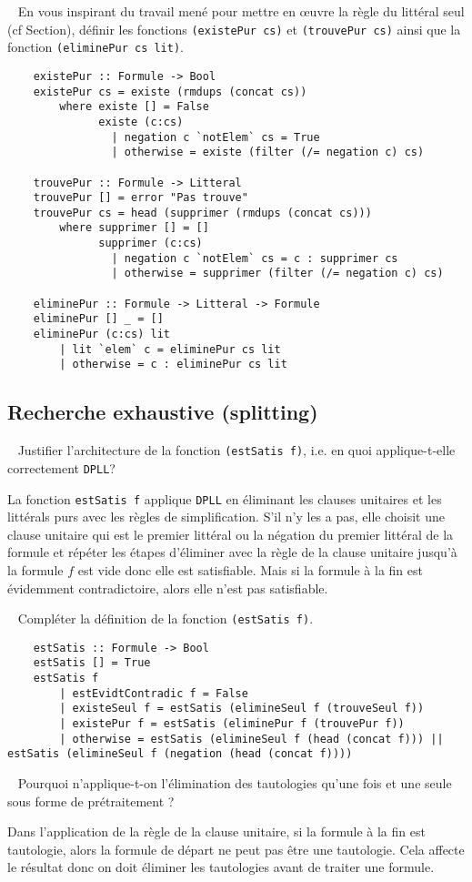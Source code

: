 \documentclass[12pt, pdflatex]{article}
\newcommand{\q}[1]{ \par\smallbreak{\noindent \bf Question #1.}\ }
\begin{document}
    \q{2} En vous inspirant du travail mené pour mettre en œuvre la règle du littéral seul (cf Section), définir les fonctions \texttt{(existePur cs)} et \texttt{(trouvePur cs)} ainsi que la fonction \texttt{(eliminePur cs lit)}.
    \begin{lstlisting}
    existePur :: Formule -> Bool 
    existePur cs = existe (rmdups (concat cs))
        where existe [] = False
              existe (c:cs) 
                | negation c `notElem` cs = True 
                | otherwise = existe (filter (/= negation c) cs)
    
    trouvePur :: Formule -> Litteral
    trouvePur [] = error "Pas trouve"
    trouvePur cs = head (supprimer (rmdups (concat cs)))
        where supprimer [] = []
              supprimer (c:cs)
                | negation c `notElem` cs = c : supprimer cs
                | otherwise = supprimer (filter (/= negation c) cs)
    
    eliminePur :: Formule -> Litteral -> Formule 
    eliminePur [] _ = []
    eliminePur (c:cs) lit
        | lit `elem` c = eliminePur cs lit
        | otherwise = c : eliminePur cs lit
    \end{lstlisting}


    \subsection{Recherche exhaustive (splitting)}
    \q{1} Justifier l’architecture de la fonction \texttt{(estSatis f)}, i.e. en quoi applique-t-elle correctement \texttt{DPLL}?
    
    La fonction \texttt{estSatis f} applique \texttt{DPLL} en éliminant les clauses unitaires et les littérals purs avec les règles de simplification. S'il n'y les a pas, elle choisit une clause unitaire qui est le premier littéral ou la négation du premier littéral de la formule et répéter les étapes d'éliminer avec la règle de la clause unitaire jusqu'à la formule $f$ est vide donc elle est satisfiable. Mais si la formule à la fin est évidemment contradictoire, alors elle n'est pas satisfiable.

    \q{2} Compléter la définition de la fonction \texttt{(estSatis f)}.
    \begin{lstlisting}
    estSatis :: Formule -> Bool 
    estSatis [] = True 
    estSatis f 
        | estEvidtContradic f = False
        | existeSeul f = estSatis (elimineSeul f (trouveSeul f))
        | existePur f = estSatis (eliminePur f (trouvePur f))
        | otherwise = estSatis (elimineSeul f (head (concat f))) || estSatis (elimineSeul f (negation (head (concat f)))) 
    \end{lstlisting}

    \q{3} Pourquoi n’applique-t-on l’élimination des tautologies qu’une fois et une seule sous forme de prétraitement ?

    Dans l'application de la règle de la clause unitaire, si la formule à la fin est tautologie, alors la formule de départ ne peut pas être une tautologie. Cela affecte le résultat donc on doit éliminer les tautologies avant de traiter une formule.
\end{document}
